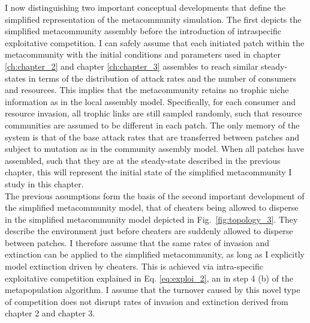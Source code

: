 \documentclass[a4paper]{report}
\begin{document}
{I now distinguishing two important conceptual developments that define the simplified representation of the metacommunity simulation. The first depicts the simplified metacommunity assembly before the introduction of intraspecific exploitative competition. I can safely assume that each initiated patch within the metacommunity with the initial conditions and parameters used in chapter \ref{ch:chapter_2} and chapter \ref{ch:chapter_3} assembles to reach similar steady-states in terms of the distribution of attack rates and the number of consumers and resources. This implies that the metacommunity retains no trophic niche information as in the local assembly model. Specifically, for each consumer and resource invasion, all trophic links are still sampled randomly, such that resource communities are assumed to be different in each patch. The only memory of the system is that of the base attack rates that are transferred between patches and subject to mutation as in the community assembly model. When all patches have assembled, such that they are at the steady-state described in the previous chapter, this will represent the initial state of the simplified metacommunity I study in this chapter. \\

The previous assumptions form the basis of the second important development of the simplified metacommunity model, that of cheaters being allowed to disperse in the simplified metacommunity model depicted in Fig.~\ref{fig:topology_3}. They describe the environment just before cheaters are suddenly allowed to disperse between patches. I therefore assume that the same rates of invasion and extinction can be applied to the simplified metacommunity, as long as I explicitly model extinction driven by cheaters. This is achieved via  intra-specific exploitative competition explained in Eq. \eqref{eq:exploi_2}, an in step 4 (b) of the metapopulation algorithm. I assume that the turnover caused by this novel type of competition does not disrupt rates of invasion and extinction derived from chapter 2 and chapter 3.

}
\end{document}
